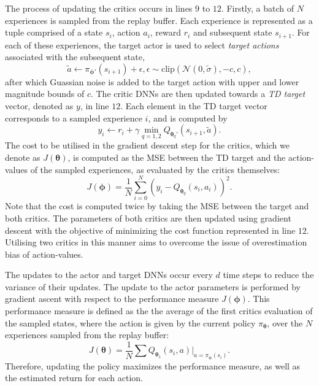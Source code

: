The process of updating the critics occurs in lines $9$ to $12$. 
Firstly, a batch of $N$ experiences is sampled from the replay buffer.
Each experience is represented as a tuple comprised of a state $s_i$, action $a_i$, reward $r_i$ and subsequent state $s_{i+1}$.
For each of these experiences, the target actor is used to select \emph{target actions} associated with the subsequent state,
\begin{equation}
    \tilde{a} \leftarrow \pi_{\bm{\phi}'}(s_{i+1}) + \epsilon, \epsilon \sim \text{clip}(\mathcal{N}(0,\tilde{\sigma}), -c,c),
\end{equation}
after which Guassian noise is added to the target action with upper and lower magnitude bounds of $c$.
The critic DNNs are then updated towards a \emph{TD target} vector, denoted as $y$, in line $12$.
Each element in the TD target vector corresponds to a sampled experience $i$, and is computed by
\begin{equation}
    y_i \leftarrow r_i + \gamma \min_{q=1,2} Q_{\bm{\theta}_q'}(s_{i+1}, \tilde{a}).
\end{equation}
The cost to be utilised in the gradient descent step for the critics, which we denote as $J(\bm{\theta})$, is computed as the MSE between the TD target and the action-values of the sampled experiences, as evaluated by the critics themselves:
\begin{equation}
     J(\bm{\phi}) = \frac{1}{N} \sum_{i=0}^{N} (y_i - Q_{\bm{\theta}_q}(s_i,a_i))^{2}.
\end{equation}
Note that the cost is computed twice by taking the MSE between the target and both critics.
The parameters of both critics are then updated using gradient descent with the objective of minimizing the cost function represented in line $12$.
Utilising two critics in this manner aims to overcome the issue of overestimation bias of action-values.


The updates to the actor and target DNNs occur every $d$ time steps to reduce the variance of their updates. 
The update to the actor parameters is performed by gradient ascent with respect to the performance measure $J(\bm{\phi})$.
This performance measure is defined as the the average of the first critics evaluation of the sampled states, where the action is given by the current policy $\pi_{\bm{\theta}}$, over the $N$ experiences sampled from the replay buffer:
\begin{equation}
    J(\bm{\theta}) = \frac{1}{N} \sum Q_{\bm{\theta}_1}(s_i,a) | _{a=\pi_{\bm{\phi}}(s_i)}.
\end{equation}
Therefore, updating the policy maximizes the performance measure, as well as the estimated return for each action.


